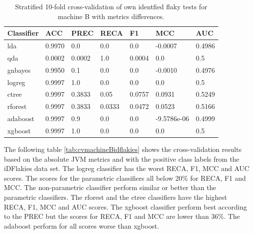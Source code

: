 \documentclass{seal_thesis}
\begin{document}
\begin{table}[ht]
\centering
\begin{tabular}{|l|l|l|l|l|l|l|}
\hline
\textbf{Classifier} & \textbf{ACC} & \textbf{PREC} & \textbf{RECA} & \textbf{F1} & \textbf{MCC} & \textbf{AUC} \\ \hline
  lda & 0.9970 & 0.0 & 0.0 & 0.0 & -0.0007 & 0.4986 \\ \hline
  qda & 0.0002 & 0.0002 & 1.0 & 0.0004 & 0.0 & 0.5 \\ \hline
  gnbayes & 0.9950 & 0.1 & 0.0 & 0.0 & -0.0010 & 0.4976 \\ \hline
  logreg & 0.9997 & 1.0 & 0.0 & 0.0 & 0.0 & 0.5 \\ \hline
  ctree & 0.9997 & 0.3833 & 0.05 & 0.0757 & 0.0931 & 0.5249 \\ \hline
  rforest & 0.9997 & 0.3833 & 0.0333 & 0.0472 & 0.0523 & 0.5166 \\ \hline
  adaboost & 0.9997 & 0.9 & 0.0 & 0.0 & -9.5786e-06 & 0.4999 \\ \hline
  xgboost & 0.9997 & 1.0 & 0.0 & 0.0 & 0.0 & 0.5 \\ \hline
\end{tabular}
\caption{Stratified 10-fold cross-validation of own identfied flaky tests for machine B with metrics differences.}
\label{tab:cvmachineBownDiff}
\end{table}



\noindent The following table \ref{tab:cvmachineBidflakies} shows the cross-validation results based on the absolute JVM metrics and with the positive class labels from the iDFlakies data set. The logreg classifier has the worst RECA, F1, MCC and AUC scores. The scores for the parametric classifiers all below 20\% for RECA, F1 and MCC. The non-parametric classifier perform similar or better than the parametric classifiers. The rforest and the ctree classifiers have the highest RECA, F1, MCC and AUC scores. The xgboost classifier perform best according to the PREC but the scores for RECA, F1 and MCC are lower than 36\%. The adaboost perform for all scores worse than xgboost. \\
\end{document}
